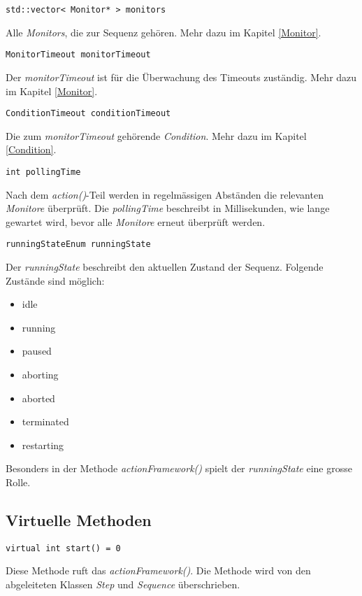 \begin{lstlisting}
std::vector< Monitor* > monitors
\end{lstlisting}
Alle \textit{Monitors}, die zur Sequenz gehören.
Mehr dazu im Kapitel \ref{Monitor}.


\begin{lstlisting}
MonitorTimeout monitorTimeout
\end{lstlisting}
Der \textit{monitorTimeout} ist für die Überwachung des Timeouts zuständig.
Mehr dazu im Kapitel \ref{Monitor}.


\begin{lstlisting}
ConditionTimeout conditionTimeout
\end{lstlisting}
Die zum \textit{monitorTimeout} gehörende \textit{Condition}.
Mehr dazu im Kapitel \ref{Condition}.



\begin{lstlisting}
int pollingTime
\end{lstlisting}
Nach dem \textit{action()}-Teil werden in regelmässigen Abständen die relevanten \textit{Monitore} überprüft.
Die \textit{pollingTime} beschreibt in Millisekunden, wie lange gewartet wird, bevor alle \textit{Monitore} erneut überprüft werden.


\begin{lstlisting}
runningStateEnum runningState
\end{lstlisting}
Der \textit{runningState} beschreibt den aktuellen Zustand der Sequenz.
Folgende Zustände sind möglich:
\begin{itemize}
\item idle
\item running
\item paused
\item aborting
\item aborted
\item terminated
\item restarting
\end{itemize}
Besonders in der Methode \textit{actionFramework()} spielt der \textit{runningState} eine grosse Rolle.



\subsection{Virtuelle Methoden}
\begin{lstlisting}
virtual int start() = 0
\end{lstlisting}
Diese Methode ruft das \textit{actionFramework()}.
Die Methode wird von den abgeleiteten Klassen \textit{Step} und \textit{Sequence} überschrieben.


